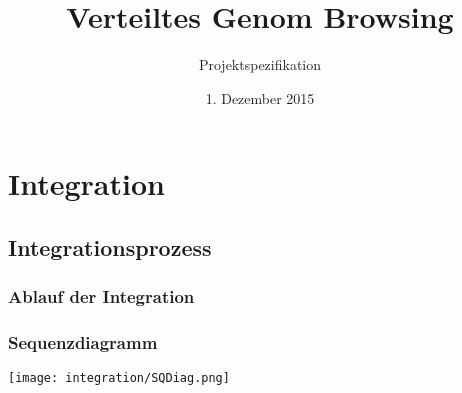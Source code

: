 \documentclass{scrartcl}
\title{Verteiltes Genom Browsing}
\subtitle{Projektspezifikation}
\date{1. Dezember 2015}
\begin{document}
\pagestyle{fancy}
\cfoot{}
\rfoot{\pagemark}
\lhead{}
\rhead{}


\setcounter{page}{-1}
\maketitle
\thispagestyle{empty}
\newpage

\tableofcontents
\thispagestyle{empty}
\newpage


\section{Integration}
\subsection{Integrationsprozess}
\subsubsection{Ablauf der Integration}
\subsubsection{Sequenzdiagramm}
\texttt{[image: integration/SQDiag.png]}
\end{document}
